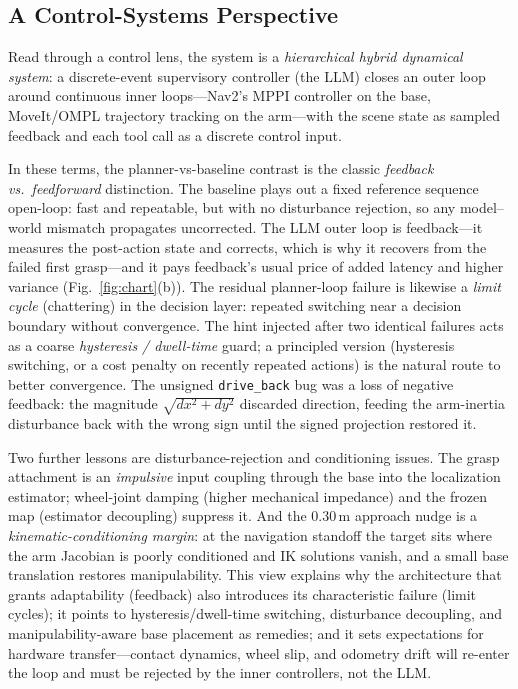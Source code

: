\documentclass[conference]{IEEEtran}
\begin{document}
\subsection{A Control-Systems Perspective}
\label{sec:control}

Read through a control lens, the system is a \emph{hierarchical hybrid
dynamical system}: a discrete-event supervisory controller (the LLM) closes
an outer loop around continuous inner loops---Nav2's MPPI controller on the
base, MoveIt/OMPL trajectory tracking on the arm---with the scene state as
sampled feedback and each tool call as a discrete control input.

In these terms, the planner-vs-baseline contrast is the classic
\emph{feedback vs.\ feedforward} distinction. The baseline plays out a fixed reference sequence open-loop:
fast and repeatable, but with no disturbance rejection, so any model--world
mismatch propagates uncorrected. The LLM outer loop is feedback---it
measures the post-action state and corrects, which is why it recovers from
the failed first grasp---and it pays feedback's usual price of added
latency and higher variance (Fig.~\ref{fig:chart}(b)). The residual
planner-loop failure is likewise a \emph{limit cycle} (chattering) in the
decision layer: repeated switching near a decision boundary without
convergence. The hint injected after two identical failures acts as a
coarse \emph{hysteresis / dwell-time} guard; a principled version
(hysteresis switching, or a cost penalty on recently repeated actions) is
the natural route to better convergence. The unsigned \texttt{drive\_back}
bug was a loss of negative feedback: the magnitude $\sqrt{dx^2+dy^2}$
discarded direction, feeding the arm-inertia disturbance back with the
wrong sign until the signed projection restored it.

Two further lessons are disturbance-rejection and conditioning issues. The
grasp attachment is an \emph{impulsive} input coupling through the base
into the localization estimator; wheel-joint damping (higher mechanical
impedance) and the frozen map (estimator decoupling) suppress it. And the
0.30\,m approach nudge is a \emph{kinematic-conditioning margin}: at the
navigation standoff the target sits where the arm Jacobian is poorly
conditioned and IK solutions vanish, and a small base translation restores
manipulability. This view explains why the architecture that grants
adaptability (feedback) also introduces its characteristic failure (limit
cycles); it points to hysteresis/dwell-time switching, disturbance
decoupling, and manipulability-aware base placement as remedies; and it
sets expectations for hardware transfer---contact dynamics, wheel slip, and
odometry drift will re-enter the loop and must be rejected by the inner
controllers, not the LLM.
\end{document}
